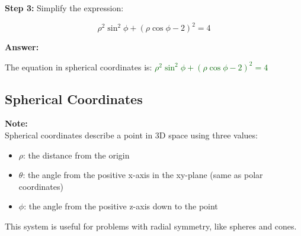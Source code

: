 \documentclass[10pt]{article}                               %
\begin{document}
\begin{adjustwidth}{2em}{0pt}
\begin{adjustwidth}{2em}{0pt}
\begin{examplebox}
\begin{adjustwidth}{2em}{0pt}
                \vspace{0.5em}
            
                \textbf{Step 3:} Simplify the expression:
                \vspace{0.25em}
            
                \[
                \rho^2\sin^2\phi + (\rho\cos\phi - 2)^2 = 4
                \]
            
                \vspace{0.5em}
            
                \textbf{Answer:}
                \vspace{0.25em}
            
                The equation in spherical coordinates is:  
                \textcolor{darkgreen}{\( \rho^2\sin^2\phi + (\rho\cos\phi - 2)^2 = 4 \)}
            
            \end{adjustwidth}
        
        \end{examplebox}

    \end{adjustwidth}


    \subsection*{Spherical Coordinates}

    \begin{adjustwidth}{2em}{0pt}

        \begin{notebox}

            \textbf{Note:} \\
            Spherical coordinates describe a point in 3D space using three values:
                    
            \begin{itemize}
                \item \( \rho \): the distance from the origin
                \item \( \theta \): the angle from the positive x-axis in the xy-plane (same as polar coordinates)
                \item \( \phi \): the angle from the positive z-axis down to the point
            \end{itemize}

            This system is useful for problems with radial symmetry, like spheres and cones.


\end{notebox}
\end{adjustwidth}
\end{adjustwidth}
\end{document}
